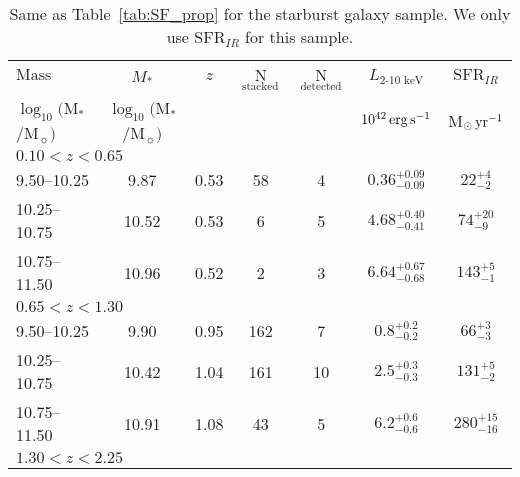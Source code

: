 \begin{table*}\centering
\caption{Same as Table~\ref{tab:SF_prop} for the starburst galaxy sample. We only use SFR$_{IR}$ for this sample.}
\vspace{5pt}
\label{tab:SB_prop}
\begin{tabular}{lc|c|c c|c c}
\hline
\hline
$\text{Mass range}$                             & $M_*$ &  $z$  & N$_{\text{stacked}}$  & N$_{\text{detected}}$ & $L_{\text{2-10~keV}}$   & $\text{SFR}_{IR}$  \\ %
$\log_{10}($M$_*$/M$_\sun)$     & $\log_{10}($M$_*$/M$_\sun)$   & &     &               & $10^{42}\,\mathrm{erg}\,\mathrm{s}^{-1}$    & M$_\odot \,\mathrm{yr}^{-1}$        \\ %
\hline
\hline
\multicolumn{7}{l}{$0.10<z<0.65$}\\
\hline
9.50--10.25          &  9.87    & 0.53 & 58 & 4     & $0.36^{+0.09}_{-0.09}$  & $ 22^{+ 4}_{- 2}$    \T \B \\
10.25--10.75     & 10.52        & 0.53 & 6  & 5         & $4.68^{+0.40}_{-0.41}$  & $ 74^{+20}_{- 9}$    \T \B \\
10.75--11.50     & 10.96        & 0.52 & 2  & 3         & $6.64^{+0.67}_{-0.68}$  & $143^{+ 5}_{- 1}$    \T \B \\
\hline                                                                                     
\hline                                                                                     
\multicolumn{7}{l}{$0.65<z<1.30$} \\  
\hline                                 
9.50--10.25              &  9.90        & 0.95 & 162 & 7        & $0.8^{+0.2}_{-0.2}$    & $ 66^{+ 3}_{- 3}$     \T \B \\
10.25--10.75     & 10.42        & 1.04 & 161 & 10       & $2.5^{+0.3}_{-0.3}$          & $131^{+ 5}_{- 2}$    \T \B \\
10.75--11.50     & 10.91        & 1.08 & 43  & 5        & $6.2^{+0.6}_{-0.6}$    & $280^{+15}_{-16}$     \T \B \\
\hline
\hline
\multicolumn{7}{l}{$1.30<z<2.25$}\\
\hline                                                                                           

\end{tabular}
\end{table*}
